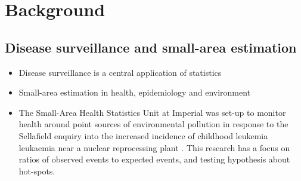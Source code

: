 \documentclass[a4paper, nobind]{templates/ociamthesis}
\providecommand{\tightlist}{%
  \setlength{\itemsep}{0pt}\setlength{\parskip}{0pt}}
\begin{document}
\begin{romanpages}
  \dominitoc %

\flushbottom

\tableofcontents

\listoffigures
	\mtcaddchapter

\listoftables
  \mtcaddchapter




\end{romanpages}

\flushbottom

\hypertarget{background}{%
\chapter*{Background}\label{background}}

\adjustmtc
{}

\hypertarget{disease-surveillance-and-small-area-estimation}{%
\section{Disease surveillance and small-area estimation}\label{disease-surveillance-and-small-area-estimation}}

\begin{itemize}
\tightlist
\item
  Disease surveillance is a central application of statistics
\item
  Small-area estimation in health, epidemiology and environment
\item
  The Small-Area Health Statistics Unit at Imperial was set-up to monitor health around point sources of environmental pollution in response to the Sellafield enquiry into the increased incidence of childhood leukemia leukaemia near a nuclear reprocessing plant \autocite{elliott1992small}. This research has a focus on ratios of observed events to expected events, and testing hypothesis about hot-spots.
\end{itemize}
\end{document}
